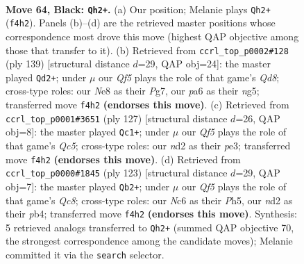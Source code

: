\documentclass[11pt]{article}
\begin{document}
\clearpage

\begin{figure}[p]\centering
\begin{subfigure}{0.46\textwidth}\centering
\resizebox{\linewidth}{!}{%
\newchessgame
\chessboard[
  setfen={3kn3/1Q6/P1n5/7K/5q2/8/3N4/8 b - - 0 64},
  showmover=false,
  pgfstyle=straightmove, color=movearrow, markmove={f4-h2}
]}
\caption{}
\end{subfigure}\hfill
\begin{subfigure}{0.46\textwidth}\centering
\resizebox{\linewidth}{!}{%
\newchessgame
\chessboard[
  setfen={6k1/6p1/5n2/5QN1/8/7P/6K1/3q4 b - - 5 70},
  showmover=false,
  pgfstyle=straightmove, color=movearrow, markmove={d1-d2}
]}
\caption{}
\end{subfigure}
\\[4pt]
\begin{subfigure}{0.46\textwidth}\centering
\resizebox{\linewidth}{!}{%
\newchessgame
\chessboard[
  setfen={8/4k3/2n5/8/2q5/4P3/6Q1/4K3 b - - 15 64},
  showmover=false,
  pgfstyle=straightmove, color=movearrow, markmove={c4-c1}
]}
\caption{}
\end{subfigure}\hfill
\begin{subfigure}{0.46\textwidth}\centering
\resizebox{\linewidth}{!}{%
\newchessgame
\chessboard[
  setfen={7k/8/6Q1/7p/1P6/P7/6K1/2q5 b - - 4 62},
  showmover=false,
  pgfstyle=straightmove, color=movearrow, markmove={c1-b2}
]}
\caption{}
\end{subfigure}
\caption{\textbf{Move 64, Black: \texttt{Qh2+}.} (a) Our position; Melanie plays \texttt{Qh2+} (\texttt{f4h2}). Panels (b)--(d) are the retrieved master positions whose correspondence most drove this move (highest QAP objective among those that transfer to it). (b) Retrieved from \texttt{ccrl\_top\_p0002\#128} (ply 139) [structural distance $d$=29, QAP obj=24]: the master played \texttt{Qd2+}; under $\mu$ our \emph{Qf5} plays the role of that game's \emph{Qd8}; cross-type roles: our \emph{N}e8 as their \emph{P}g7, our \emph{p}a6 as their \emph{n}g5; transferred move \texttt{f4h2} \textbf{(endorses this move)}. (c) Retrieved from \texttt{ccrl\_top\_p0001\#3651} (ply 127) [structural distance $d$=26, QAP obj=8]: the master played \texttt{Qc1+}; under $\mu$ our \emph{Qf5} plays the role of that game's \emph{Qc5}; cross-type roles: our \emph{n}d2 as their \emph{p}e3; transferred move \texttt{f4h2} \textbf{(endorses this move)}. (d) Retrieved from \texttt{ccrl\_top\_p0000\#1845} (ply 123) [structural distance $d$=29, QAP obj=7]: the master played \texttt{Qb2+}; under $\mu$ our \emph{Qf5} plays the role of that game's \emph{Qc8}; cross-type roles: our \emph{N}c6 as their \emph{P}h5, our \emph{n}d2 as their \emph{p}b4; transferred move \texttt{f4h2} \textbf{(endorses this move)}. Synthesis: 5 retrieved analogs transferred to \texttt{Qh2+} (summed QAP objective 70, the strongest correspondence among the candidate moves); Melanie committed it via the \texttt{search} selector.}
\label{fig:thought-m127}
\end{figure}
\end{document}
